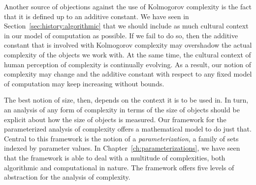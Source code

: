 Another source of objections against the use of Kolmogorov complexity is the fact that it is defined up to an additive constant.
We have seen in Section~\ref{sec:history:algorithmic} that we should include as much cultural context in our model of computation as possible.
If we fail to do so, then the additive constant that is involved with Kolmogorov complexity may overshadow the actual complexity of the objects we work with.
At the same time, the cultural context of human perception of complexity is continually evolving.
As a result, our notion of complexity may change and the additive constant with respect to any fixed model of computation may keep increasing without bounds.

The best notion of size, then, depends on the context it is to be used in.
In turn, an analysis of any form of complexity in terms of the size of objects should be explicit about how the size of objects is measured.
Our framework for the parameterized analysis of complexity offers a mathematical model to do just that.
Central to this framework is the notion of a \emph{parameterization}, a family of sets indexed by parameter values.
In Chapter~\ref{ch:parameterizations}, we have seen that the framework is able to deal with a multitude of complexities, both algorithmic and computational in nature.
The framework offers five levels of abstraction for the analysis of complexity.
